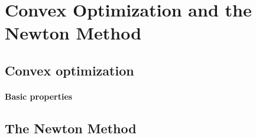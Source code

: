 \documentclass[main]{subfiles}
\begin{document}

\section{Convex Optimization and the Newton Method}

\subsection{Convex optimization}
\paragraph{Basic properties}

\subsection{The Newton Method}
\end{document}

